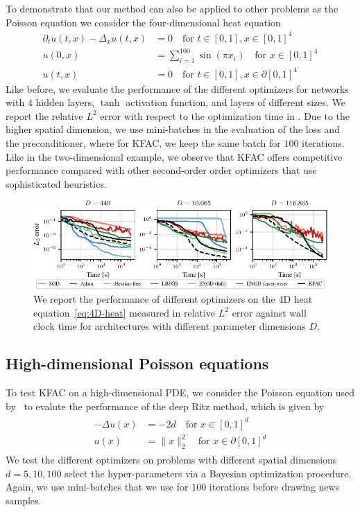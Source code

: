 To demonstrate that our method can also be applied to other problems as the Poisson equation we consider the four-dimensional heat equation
\begin{align}\label{eq:4D-heat}
     \partial_t u(t,x)-\Delta_x u(t,x) & = 0 \quad \text{for } t\in[0,1], x\in [0,1]^{4} \\
    u(0,x) & = \sum_{i=1}^{100} \sin(\pi x_i) \quad \text{for }
     x\in [0,1]^{4}
     \\
     u(t,x) & = 0 \quad \text{for } t\in[0,1], x\in\partial[0,1]^{4}
\end{align}
Like before, we evaluate the performance of the different optimizers for networks with $4$ hidden layers, $\tanh$ activation function, and layers of different sizes.
We report the relative $L^2$ error with respect to the optimization time in .
Due to the higher spatial dimension, we use mini-batches in the evaluation of the loss and the preconditioner, where for KFAC, we keep the same batch for $100$ iterations. 
Like in the two-dimensional example, we observe that KFAC offers competitive performance compared with other second-order order optimizers that use sophisticated heuristics. 
\begin{figure}
    \centering
    \includegraphics{kfac_pinns_exp/exp30_heat4d_groupplot/l2_error_over_time.pdf}
    \caption{We report the performance of different optimizers on the 4D heat equation~\eqref{eq:4D-heat} measured in relative $L^2$ error against wall clock time for architectures with different parameter dimensions $D$.}
    \label{fig:4D-heat}
\end{figure}


\subsection{High-dimensional Poisson equations}
To test KFAC on a high-dimensional PDE, we consider the Poisson equation used by~\cite{yu2018deep} to evalute the performance of the deep Ritz method, which is given by 
\begin{align}\label{eq:high_dimensional_poisson}
    \begin{split}
        -\Delta u(x) & = -2d \quad \text{for } x\in [0,1]^{d} \\
    u(x) & = \lVert x \rVert_2^2 \quad \text{for } x\in \partial[0,1]^{d}
    \end{split}
\end{align}
We test the different optimizers on problems with different spatial dimensions $d=5, 10, 100$ select the hyper-parameters via a Bayesian optimization procedure. 
Again, we use mini-batches that we use for $100$ iterations before drawing news samples. 


